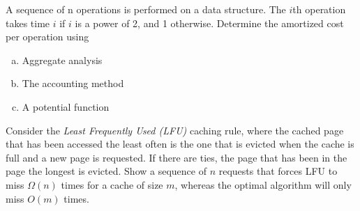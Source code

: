 \documentclass[fleqn]{homework}
\begin{document}
  \begin{problem}{5}
    \begin{question}
      A sequence of n operations is performed on a data structure.  The $i$th
      operation takes time $i$ if $i$ is a power of 2, and 1
      otherwise. Determine the amortized cost per operation using
      \begin{enumerate}[a.]
      \item Aggregate analysis
      \item The accounting method
      \item A potential function
      \end{enumerate}
    \end{question}
  \end{problem}

  \begin{problem}{6}
    \begin{question}
      Consider the \textit{Least Frequently Used (LFU)} caching rule, where the
      cached page that has been accessed the least often is the one that is
      evicted when the cache is full and a new page is requested. If there are
      ties, the page that has been in the page the longest is evicted. Show a
      sequence of $n$ requests that forces LFU to miss $\Omega(n)$ times for a
      cache of size $m$, whereas the optimal algorithm will only miss $O(m)$
      times.
    \end{question}
  \end{problem}
\end{document}
